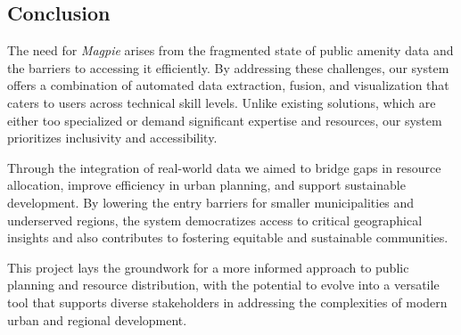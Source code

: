 \newpage{}

\subsection{Conclusion}

The need for \textit{Magpie} arises from the fragmented state of public amenity
data and the barriers to accessing it efficiently. By addressing these
challenges, our system offers a combination of automated data extraction,
fusion, and visualization that caters to users across technical skill levels.
Unlike existing solutions, which are either too specialized or demand
significant expertise and resources, our system prioritizes inclusivity and
accessibility.

Through the integration of real-world data we aimed to bridge gaps in resource
allocation, improve efficiency in urban planning, and support sustainable
development. By lowering the entry barriers for smaller municipalities and
underserved regions, the system democratizes access to critical geographical
insights and also contributes to fostering equitable and sustainable
communities.

This project lays the groundwork for a more informed approach to public planning
and resource distribution, with the potential to evolve into a versatile tool
that supports diverse stakeholders in addressing the complexities of modern
urban and regional development.

\newpage{}